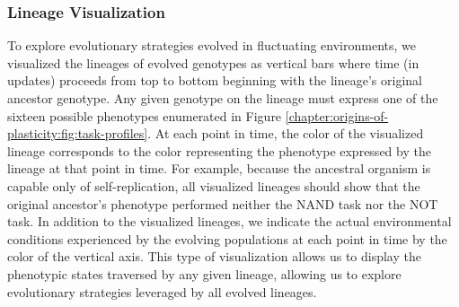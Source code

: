 

\subsubsection{Lineage Visualization}
\label{chapter:origins-of-plasticity:sec:methods:experimental-design:lineage-visualization}

To explore evolutionary strategies evolved in fluctuating environments, we visualized the lineages of evolved genotypes as vertical bars where time (in updates) proceeds from top to bottom beginning with the lineage's original ancestor genotype.
Any given genotype on the lineage must express one of the sixteen possible phenotypes enumerated in Figure \ref{chapter:origins-of-plasticity:fig:task-profiles}.
At each point in time, the color of the visualized lineage corresponds to the color representing the phenotype expressed by the lineage at that point in time. 
For example, because the ancestral organism is capable only of self-replication, all visualized lineages should show that the original ancestor's phenotype performed neither the NAND task nor the NOT task. 
In addition to the visualized lineages, we indicate the actual environmental conditions experienced by the evolving populations at each point in time by the color of the vertical axis. 
This type of visualization allows us to display the phenotypic states traversed by any given lineage, allowing us to explore evolutionary strategies leveraged by all evolved lineages.
